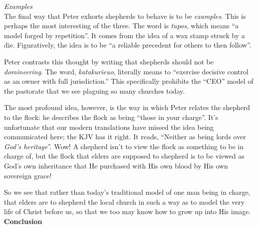 \documentclass[letterpaper, 12pt]{article}
\begin{document}
    \noindent \emph{Examples} \\

    The final way that Peter exhorts shepherds to behave is to be
    \emph{examples}.  This is perhaps the most interesting of the three.
    The word is \emph{tupos}, which means ``a model forged by
    repetition''.  It comes from the idea of a wax stamp struck by a
    die.  Figuratively, the idea is to be ``a reliable precedent for
    others to then follow''.

    Peter contrasts this thought by writing that shepherds should not be
    \emph{domineering}.  The word, \emph{katakurieuo}, literally means
    to ``exercise decisive control as an owner with full jurisdiction.''
    This specifically prohibits the ``CEO'' model of the pastorate that
    we see plaguing so many churches today.

    The most profound idea, however, is the way in which Peter relates
    the shepherd to the flock: he describes the flock as being ``those
    in your charge''.  It's unfortunate that our modern translations
    have missed the idea being communicated here; the KJV has it right.
    It reads, ``Neither as being lords over \emph{God's heritage}''.
    Wow!  A shepherd isn't to view the flock as something to be in
    charge of, but the flock that elders are supposed to shepherd is to
    be viewed as God's own inheritance that He purchased with His own
    blood by His own sovereign grace!

    So we see that rather than today's traditional model of one man
    being in charge, that elders are to shepherd the local church in
    such a way as to model the very life of Christ before us, so that we
    too may know how to grow up into His image. \\

    \noindent \textbf{Conclusion} \\
\end{document}
